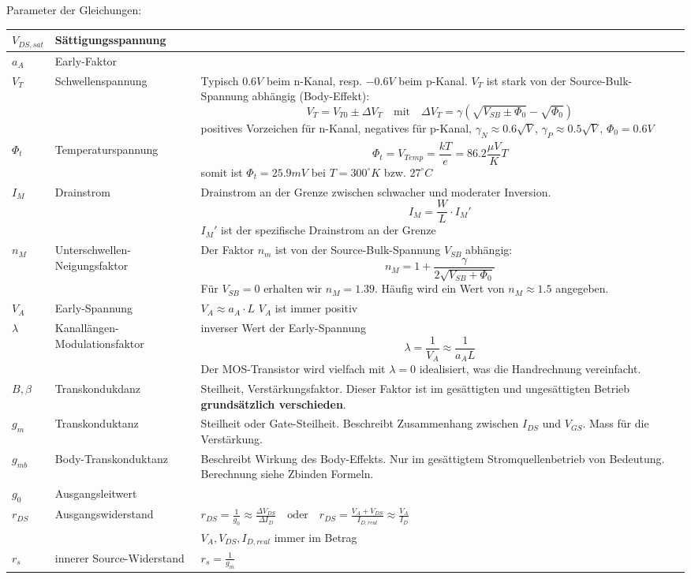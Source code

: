 Parameter der Gleichungen:

\begin{tabularx}{\linewidth}{|l|l|X|}
	\hline
		$V_{DS,sat}$	& Sättigungsspannung	&
	\\ \hline
		$a_A$			& Early-Faktor			&
	\\ \hline
		$V_T$ & Schwellenspannung &
		Typisch $0.6V$ beim n-Kanal, resp. $-0.6V$ beim p-Kanal. $V_T$ ist stark von der Source-Bulk-Spannung abhängig (Body-Effekt):
		\[ 
			V_T = V_{T0} \pm \Delta V_T \quad \text{mit} \quad \Delta V_T = \gamma(\sqrt{V_{SB} \pm \Phi_0} -\sqrt{\Phi_0})
		\]
		positives Vorzeichen für n-Kanal, negatives für p-Kanal, $\gamma_N \approx 0.6\sqrt{V}$, $\gamma_P \approx 0.5\sqrt{V}$, $\Phi_{0} = 0.6V$ 
	\\ \hline
		$\Phi_t$ & Temperaturspannung &
		\[
			\Phi_t = V_{Temp} = \frac{kT}{e} = 86.2 \frac{\mu V}{K}T
		\]
		somit ist $\Phi_t = 25.9mV$ bei $T=300^\circ K$ bzw. $27^\circ C$
	\\ \hline
		$I_M$ & Drainstrom &
		Drainstrom an der Grenze zwischen schwacher und moderater Inversion.
		\[
			I_M = \frac{W}{L} \cdot I_M'
		\]
		$I_M'$ ist der spezifische Drainstrom an der Grenze
	\\ \hline
		$n_M$ & Unterschwellen-Neigungsfaktor &
		Der Faktor $n_m$ ist von der Source-Bulk-Spannung $V_{SB}$ abhängig:
		\[
			n_M = 1 + \frac{\gamma}{2 \sqrt{V_{SB} + \Phi_0}}
		\]
		Für $V_{SB} = 0$ erhalten wir $n_M=1.39$. Häufig wird ein Wert von $n_M \approx 1.5$ angegeben.
	\\ \hline
		$V_A$			& Early-Spannung		& $V_A \approx a_A \cdot L$ \quad $V_{A}$ ist immer positiv
	\\ \hline
		$\lambda$ & Kanallängen-Modulationsfaktor &
		inverser Wert der Early-Spannung
		\[
			\lambda = \frac{1}{V_A} \approx \frac{1}{a_A L}
		\]
		Der MOS-Transistor wird vielfach mit $\lambda = 0$ idealisiert, was die Handrechnung vereinfacht.
	\\ \hline
		$B, \beta$ & Transkondukdanz &
		Steilheit, Verstärkungsfaktor. Dieser Faktor ist im gesättigten und ungesättigten Betrieb \textbf{grundsätzlich verschieden}.
	\\ \hline
		$g_{m}$	& Transkonduktanz & Steilheit oder Gate-Steilheit. Beschreibt Zusammenhang zwischen $I_{DS}$ und $V_{GS}$. Mass für die Verstärkung.
	\\ \hline
		$g_{mb}$ & Body-Transkonduktanz & Beschreibt Wirkung des Body-Effekts. Nur im gesättigtem Stromquellenbetrieb von Bedeutung. Berechnung siehe Zbinden Formeln.
	\\ \hline
		$g_{0}$ & Ausgangsleitwert &
	\\ \hline
		$r_{DS}$ & Ausgangswiderstand & $r_{DS} = \frac{1}{g_0} \approx \frac{\Delta 	V_{DS}}{\Delta I_D} \quad 
													  \text{oder} \quad r_{DS} = \frac{V_A + V_{DS}}{I_{D,real}} \approx \frac{V_A}{I_D} $ 
	\\				&			&$V_{A}, V_{DS}, I_{D,real}$ immer im Betrag  
	\\ \hline
		$r_{s}$	& innerer Source-Widerstand & $r_{s} = \frac{1}{g_{m}}$
	\\ \hline
\end{tabularx}


